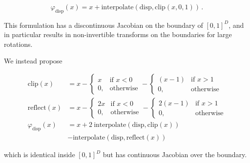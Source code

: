\begin{equation}
    \varphi_\text{disp}(x) = x + \text{interpolate}(\text{disp}, \text{clip}(x, 0, 1))\,.
\end{equation}

This formulation has a discontinuous Jacobian on the boundary of $[0, 1]^D$, and in particular results in non-invertible transforms on the boundaries for large rotations.

We instead propose 

\begin{align}
\text{clip}(x) &= x - 
    \begin{cases}
     x& \text{if } x < 0\\
    0,              & \text{otherwise}
\end{cases}
    -
    \begin{cases}
     (x - 1)& \text{if } x > 1\\
    0,              & \text{otherwise}
\end{cases}\\
    \text{reflect}(x) &= x - 
    \begin{cases}
     2x& \text{if } x < 0\\
    0,              & \text{otherwise}
\end{cases}
    -
    \begin{cases}
     2(x - 1)& \text{if } x>  1\\
    0,              & \text{otherwise}
\end{cases}\\
    \varphi_\text{disp}(x) &= x + 2~\text{interpolate}(\text{disp}, \text{clip}(x)) \\
    & - \text{interpolate}(\text{disp}, \text{reflect}(x))
\end{align}

which is identical inside $[0, 1]^D$ but has continuous Jacobian over the boundary.

\iffalse
